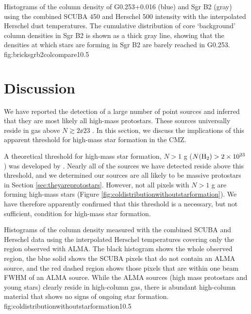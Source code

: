 \documentclass[twocolumn]{aastex61}
\begin{document}
{Histograms of the column density of G0.253+0.016 (blue) and Sgr B2 (gray)
using the combined SCUBA 450 \um and Herschel 500 \um intensity with the
interpolated Herschel dust temperatures.  The cumulative distribution of core
`background' column densities in Sgr B2 is shown as a thick gray line, showing
that the densities at which stars are forming in Sgr B2 are barely
reached in G0.253.  }
{fig:bricksgrb2colcompare}{1}{0.5\textwidth}



\section{Discussion}
We have reported the detection of a large number of point sources and inferred
that they are most likely all high-mass protostars.  These sources universally
reside in gas above $N\gtrsim2\ee{23}$ \persc.  In this section, we discuss
the implications of this apparent threshold for high-mass star formation in the
CMZ.

A theoretical threshold for high-mass star formation, $N > 1$ g \persc ($N(\textrm{H}_{2})
> 2\times10^{23}$ \persc) was
developed by \citet{Krumholz2008a}.   Nearly all of the sources we have
detected reside above this threshold, and we determined our sources are all
likely to be massive protostars in Section \ref{sec:theyareprotostars}.
However, not all pixels with $N > 1$ g \persc are forming high-mass stars
(Figure \ref{fig:coldistributionwithoutstarformation}).  We
have therefore apparently confirmed that this threshold is a necessary, but not
sufficient, condition for high-mass star formation.



{Histograms of the column density measured with the combined SCUBA and Herschel
data using the interpolated Herschel temperatures covering only the region
observed with ALMA.  The black histogram shows the whole observed region,
the blue solid shows the SCUBA pixels that do not contain an ALMA source,
and the red dashed region shows those pixels that are within one beam
FWHM of an ALMA source.  While the ALMA sources (high mass protostars and young
stars)
clearly reside in high-column gas, there is abundant high-column material
that shows no signs of ongoing star formation.}
{fig:coldistributionwithoutstarformation}{1}{0.5\textwidth}
\end{document}
